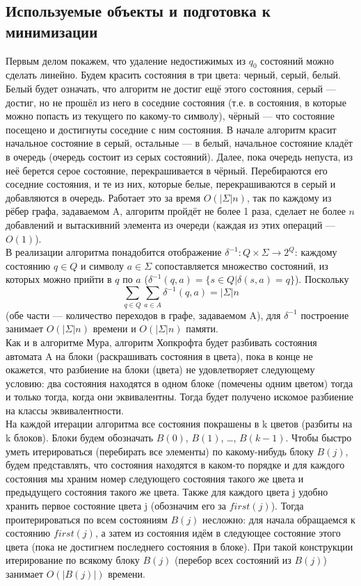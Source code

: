 \documentclass{article}
\begin{document}
\subsection{Используемые объекты и подготовка к минимизации}
Первым делом покажем, что удаление недостижимых из $q_0$ состояний можно сделать линейно. Будем красить состояния в три цвета: черный, серый, белый. Белый будет означать, что алгоритм не достиг ещё этого состояния, серый --- достиг, но не прошёл из него в соседние состояния (т.е. в состояния, в которые можно попасть из текущего по какому-то символу), чёрный --- что состояние посещено и достигнуты соседние с ним состояния. В начале алгоритм красит начальное состояние в серый, остальные --- в белый, начальное состояние кладёт в очередь (очередь состоит из серых состояний). Далее, пока очередь непуста, из неё берется серое состояние, перекрашивается в чёрный. Перебираются его соседние состояния, и те из них, которые белые, перекрашиваются в серый и добавляются в очередь. Работает это за время $O(|\Sigma| n)$, так по каждому из рёбер графа, задаваемом A, алгоритм пройдёт не более 1 раза, сделает не более $n$ добавлений и вытаскивний элемента из очереди (каждая из этих операций --- $O(1)$).\\
В реализации алгоритма понадобится отображение $\delta^{-1}: Q \times \Sigma \longrightarrow 2^{Q}$: каждому состоянию $q \in Q$ и символу $a \in \Sigma$ сопоставляется множество состояний, из которых можно прийти в $q$ по $a$ ($\delta^{-1}(q, a) = \{s \in Q | \delta(s, a) = q\}$). Поскольку 
\[ \sum_{q \in Q} \sum_{a \in A} \delta^{-1}(q, a) = |\Sigma|n\] (обе части --- количество переходов в графе, задаваемом A), для $\delta^{-1}$ построение занимает $O(|\Sigma| n)$ времени и $O(|\Sigma| n)$ памяти.\\
Как и в алгоритме Мура, алгоритм Хопкрофта будет разбивать состояния автомата A на блоки (раскрашивать состояния в цвета), пока в конце не окажется, что разбиение на блоки (цвета) не удовлетворяет следующему условию: два состояния находятся в одном блоке (помечены одним цветом) тогда и только тогда, когда они эквивалентны. Тогда будет получено искомое разбиение на классы эквивалентности.\\
На каждой итерации алгоритма все состояния покрашены в k цветов (разбиты на k блоков). Блоки будем обозначать $B(0)$, $B(1)$, \dots, $B(k - 1)$. Чтобы быстро уметь итерироваться (перебирать все элементы) по какому-нибудь блоку $B(j)$, будем представлять, что состояния находятся в каком-то порядке и для каждого состояния мы храним номер следующего состояния такого же цвета и предыдущего состояния такого же цвета. Также для каждого цвета j удобно хранить первое состояние цвета j (обозначим его за $first(j)$). Тогда проитерироваться по всем состояниям $B(j)$ несложно: для начала обращаемся к состоянию $first(j)$, а затем из состояния идём в следующее состояние этого цвета (пока не достигнем последнего состояния в блоке). При такой конструкции итерирование по всякому блоку $B(j)$ (перебор всех состояний из $B(j)$) занимает $O(|B(j)|)$ времени.\\
\end{document}
